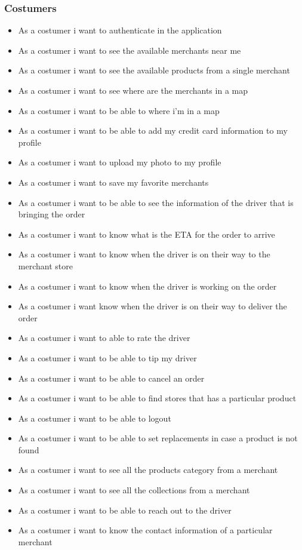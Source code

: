 \subsubsection{Costumers}
\begin{itemize}
    \item As a costumer i want to authenticate in the application
    \item As a costumer i want to see the available merchants near me
    \item As a costumer i want to see the available products from a single 
    merchant
    \item As a costumer i want to see where are the merchants in a map
    \item As a costumer i want to be able to where i’m in a map
    \item As a costumer i want to be able to add my credit card information 
    to my profile
    \item As a costumer i want to upload my photo to my profile
    \item As a costumer i want to save my favorite merchants
    \item As a costumer i want to be able to see the information of the driver 
    that is bringing the order
    \item As a costumer i want to know what is the ETA for the order to arrive
    \item As a costumer i want to know when the driver is on their way to the 
    merchant store
    \item As a costumer i want to know when the driver is working on the order
    \item As a costumer i want know when the driver is on their way to deliver 
    the order
    \item As a costumer i want to able to rate the driver
    \item As a costumer i want to be able to tip my driver
    \item As a costumer i want to be able to cancel an order
    \item As a costumer i want to be able to find stores that has a particular 
    product
    \item As a costumer i want to be able to logout
    \item As a costumer i want to be able to set replacements in case a 
    product is not found
    \item As a costumer i want to see all the products category from a merchant
    \item As a costumer i want to see all the collections from a merchant
    \item As a costumer i want to be able to reach out to the driver
    \item As a costumer i want to know the contact information of a 
    particular merchant
\end{itemize}
